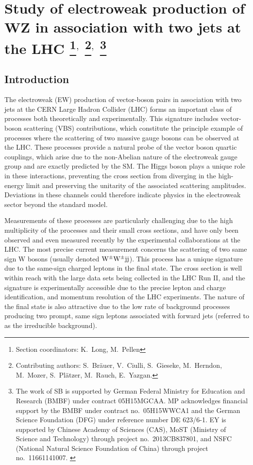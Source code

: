 \documentclass[11pt]{cernrep}
\begin{document}
\section{Study of electroweak production of WZ in association with two jets at the LHC 
\protect\footnote{Section coordinators: K.~Long, M.~Pellen}$^{,}$ 
\protect\footnote{Contributing authors: S.~Br\"auer, V.~Ciulli, S.~Gieseke, M.~Herndon, M.~Mozer, S.~Pl{\"a}tzer, M.~Rauch, E.~Yazgan.}$^{,}$
\protect\footnote{The work of SB is supported by German Federal Ministry for Education and Research (BMBF) under contract 05H15MGCAA.
MP acknowledges financial support by the BMBF under contract no.~05H15WWCA1 and the German Science Foundation (DFG) under reference number DE 623/6-1. 
EY is supported by Chinese Academy of Sciences (CAS), MoST (Ministry of Science and Technology) through project no.~2013CB837801, and NSFC (National Natural Science Foundation of China) through project no.~11661141007. 
\label{vbs_section}}}

\subsection{Introduction \label{vbs_intro}}

The electroweak (EW) production of vector-boson pairs in association with two jets at the CERN Large Hadron Collider (LHC) forms an important class of processes both theoretically and experimentally.
This signature includes vector-boson scattering (VBS) contributions, which constitute the principle example of processes where the scattering of two massive gauge bosons can be observed at the LHC.
These processes provide a natural probe of the vector boson quartic couplings, which arise due to the non-Abelian nature of the electroweak gauge group and are exactly predicted by the SM.
The Higgs boson plays a unique role in these interactions, preventing the cross section from diverging in the high-energy limit and preserving the unitarity of the associated scattering amplitudes.
Deviations in these channels could therefore indicate physics in the electroweak sector beyond the standard model.

Measurements of these processes are particularly challenging due to the high multiplicity of the processes and their small cross sections, and 
have only been observed and even measured recently by the experimental collaborations at the LHC.
The most precise current measurement \cite{Aad:2014zda,Khachatryan:2014sta,Sirunyan:2017ret,Aaboud:2016ffv} concerns the scattering of two same sign W bosons (usually denoted ${\rm W}^\pm{\rm W}^\pm{\rm j}{\rm j}$).
This process has a unique signature due to the same-sign charged leptons in the final state.
The cross section is well within reach with the large data sets being collected in the LHC Run II, and the
signature is experimentally accessible due to the precise lepton and charge identification, and momentum resolution of the LHC experiments.
The nature of the final state is also attractive due to the low rate of background processes
producing two prompt, same sign leptons associated with forward jets (referred to as the irreducible background).
\end{document}
